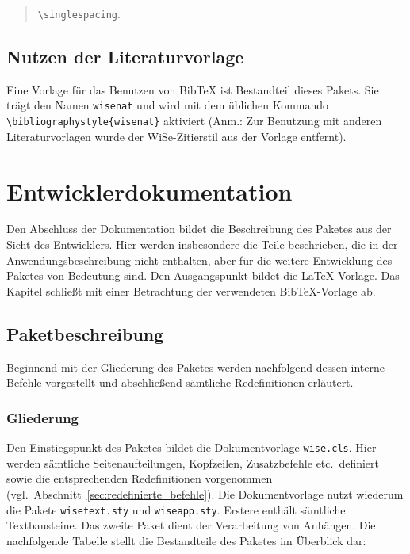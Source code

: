 \documentclass[english, trackchanges, hyperref, ngerman ,pdf, mp, mppdf]{wise}
\newcommand\code[1]{\texttt{#1}}
\newcommand\command[1]{\code{\textbackslash{}#1}}
\begin{document}
\begin{quotation}
\command{singlespacing}.
\end{quotation}

\subsection{Nutzen der Literaturvorlage}

Eine Vorlage für das Benutzen von Bib\TeX{} ist Bestandteil dieses
Pakets. Sie trägt den Namen \code{wisenat} und wird mit dem üblichen
Kommando \command{bibliographystyle\{wisenat\}} aktiviert
(Anm.: Zur Benutzung mit anderen Literaturvorlagen wurde der WiSe-Zitierstil
aus der Vorlage entfernt). 


\section{Entwicklerdokumentation}
Den Abschluss der Dokumentation bildet die Beschreibung des Paketes
aus der Sicht des Entwicklers. Hier werden insbesondere die Teile
beschrieben, die in der Anwendungsbeschreibung nicht enthalten, aber
für die weitere Entwicklung des Paketes von Bedeutung sind. Den Ausgangspunkt
bildet die \LaTeX{}-Vorlage. Das Kapitel schließt mit einer Betrachtung
der verwendeten Bib\TeX{}-Vorlage ab.


\subsection{Paketbeschreibung}

Beginnend mit der Gliederung des Paketes werden nachfolgend dessen
interne Befehle vorgestellt und abschließend sämtliche Redefinitionen
erläutert. 


\subsubsection{Gliederung}

Den Einstiegspunkt des Paketes bildet die Dokumentvorlage \code{wise.cls}.
Hier werden sämtliche Seitenaufteilungen, Kopfzeilen, Zusatzbefehle
etc.\ definiert sowie die entsprechenden Redefinitionen vorgenommen
(vgl.~Abschnitt~\ref{sec:redefinierte_befehle}). Die Dokumentvorlage
nutzt wiederum die Pakete \code{wisetext.sty} und \code{wiseapp.sty}.
Erstere enthält sämtliche Textbausteine. Das zweite Paket dient der
Verarbeitung von Anhängen. Die nachfolgende Tabelle stellt die Bestandteile
des Paketes im Überblick dar:
\end{document}

